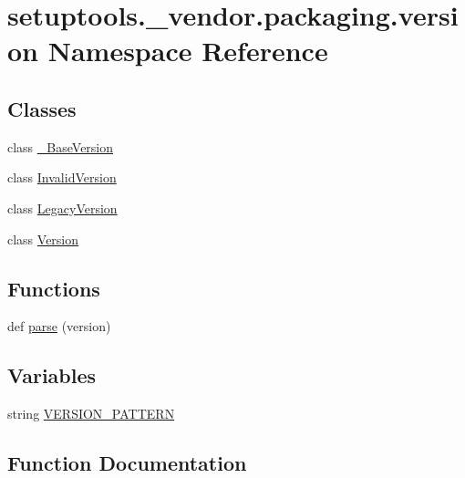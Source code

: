 \hypertarget{namespacesetuptools_1_1__vendor_1_1packaging_1_1version}{}\section{setuptools.\+\_\+vendor.\+packaging.\+version Namespace Reference}
\label{namespacesetuptools_1_1__vendor_1_1packaging_1_1version}
\subsection*{Classes}
\begin{DoxyCompactItemize}
\item 
class \hyperlink{classsetuptools_1_1__vendor_1_1packaging_1_1version_1_1___base_version}{\+\_\+\+Base\+Version}
\item 
class \hyperlink{classsetuptools_1_1__vendor_1_1packaging_1_1version_1_1_invalid_version}{Invalid\+Version}
\item 
class \hyperlink{classsetuptools_1_1__vendor_1_1packaging_1_1version_1_1_legacy_version}{Legacy\+Version}
\item 
class \hyperlink{classsetuptools_1_1__vendor_1_1packaging_1_1version_1_1_version}{Version}
\end{DoxyCompactItemize}
\subsection*{Functions}
\begin{DoxyCompactItemize}
\item 
def \hyperlink{namespacesetuptools_1_1__vendor_1_1packaging_1_1version_a25610ec48cdc759b4283c76188365c93}{parse} (version)
\end{DoxyCompactItemize}
\subsection*{Variables}
\begin{DoxyCompactItemize}
\item 
string \hyperlink{namespacesetuptools_1_1__vendor_1_1packaging_1_1version_ad46cecc46feb4de88da267346b09be3e}{V\+E\+R\+S\+I\+O\+N\+\_\+\+P\+A\+T\+T\+E\+RN}
\end{DoxyCompactItemize}


\subsection{Function Documentation}
\mbox{\label{namespacesetuptools_1_1__vendor_1_1packaging_1_1version_a25610ec48cdc759b4283c76188365c93}} 
